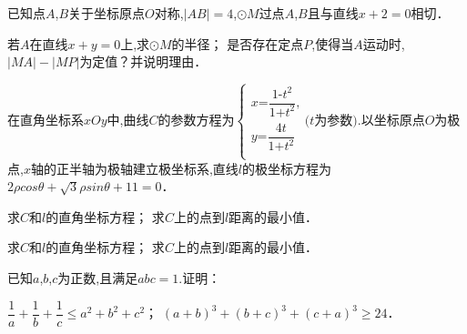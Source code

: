 \documentclass[windows,list]{BHCexam}
\begin{document}
\begin{groups}
\begin{questions}[t]
\begin{minipage}{\linewidth}
\begin{solution}{6cm}
\end{solution}
\end{minipage}
\vfill
\begin{minipage}{\linewidth}
\question[12] 已知点$A$,$B$关于坐标原点$O$对称,$|AB|=4$,$ \odot M$过点$A$,$B$且与直线$x+2=0$相切．
\begin{subquestions}
    \subquestion 若$A$在直线$x+y=0$上,求$ \odot M$的半径； 
    \subquestion 是否存在定点$P$,使得当$A$运动时,$|MA|-|MP|$为定值？并说明理由．
\end{subquestions}
\begin{solution}{6cm}
\end{solution}
\end{minipage}
\vfill
\begin{minipage}{\linewidth}
\question[10] 在直角坐标系$xOy$中,曲线$C$的参数方程为$\begin{cases} x\text{=}\dfrac{1\text{-}t^{2}}{1\text{+}t^{2}}\text{,} \\ y\text{=}\dfrac{4t}{1\text{+}t^{2}} \\ \end{cases} (t$为参数$).$以坐标原点$O$为极点,$x$轴的正半轴为极轴建立极坐标系,直线$l$的极坐标方程为$2 \rho cos \theta + \sqrt{3}  \rho sin \theta +11=0$．
\begin{subquestions}
    \subquestion 求$C$和$l$的直角坐标方程； 
    \subquestion 求$C$上的点到$l$距离的最小值．
	\begin{subquestions}
		\subquestion 求$C$和$l$的直角坐标方程； 
		\subquestion 求$C$上的点到$l$距离的最小值．
		
	\end{subquestions}
\end{subquestions}
\begin{solution}{6cm}

\end{solution}
\end{minipage}
\vfill
\begin{minipage}{\linewidth}
\question[12] 已知$a$,$b$,$c$为正数,且满足$abc=1.$证明： 
\begin{subquestions}
    \subquestion $\dfrac{1}{a} + \dfrac{1}{b} + \dfrac{1}{c} \leqslant a ^{2} +b ^{2} +c ^{2}$； 
    \subquestion $(a+b) ^{3} +(b+c) ^{3} +(c+a) ^{3} \geqslant 24$．
\end{subquestions}
\begin{solution}{6cm}

\end{solution}
\end{minipage}
\vfill
\end{questions}
\end{groups}
\label{lastpage}
\end{document}
